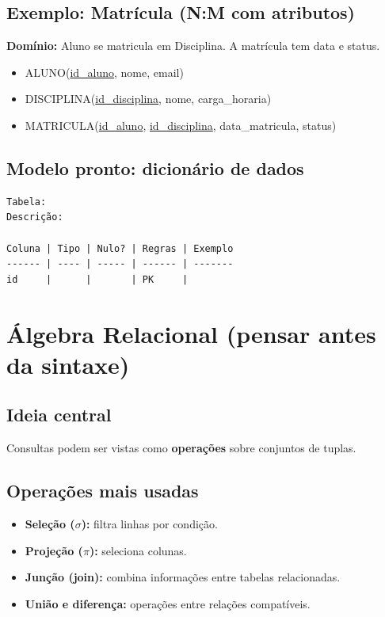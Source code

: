 \documentclass[12pt,a4paper]{article}
\begin{document}
\subsection{Exemplo: Matrícula (N:M com atributos)}
\textbf{Domínio:} Aluno se matricula em Disciplina. A matrícula tem data e status.

\begin{itemize}[leftmargin=*,itemsep=0.2em]
  \item ALUNO(\underline{id\_aluno}, nome, email)
  \item DISCIPLINA(\underline{id\_disciplina}, nome, carga\_horaria)
  \item MATRICULA(\underline{id\_aluno}, \underline{id\_disciplina}, data\_matricula, status)
\end{itemize}

\subsection{Modelo pronto: dicionário de dados}
\begin{lstlisting}[style=text]
Tabela:
Descrição:

Coluna | Tipo | Nulo? | Regras | Exemplo
------ | ---- | ----- | ------ | -------
id     |      |       | PK     |
\end{lstlisting}

\section{Álgebra Relacional (pensar antes da sintaxe)}

\subsection{Ideia central}
Consultas podem ser vistas como \textbf{operações} sobre conjuntos de tuplas.

\subsection{Operações mais usadas}
\begin{itemize}[leftmargin=*,itemsep=0.2em]
  \item \textbf{Seleção ($\sigma$):} filtra linhas por condição.
  \item \textbf{Projeção ($\pi$):} seleciona colunas.
  \item \textbf{Junção (join):} combina informações entre tabelas relacionadas.
  \item \textbf{União e diferença:} operações entre relações compatíveis.
\end{itemize}
\end{document}
